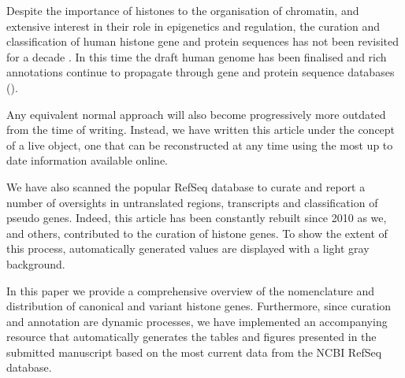 

  Despite the importance of histones to the organisation of chromatin, and extensive interest
  in their role in epigenetics and regulation, the curation and classification of human histone
  gene and protein sequences has not been revisited for a decade \citep{Marzluff02}. In this time
  the draft human genome has been finalised and rich annotations continue to propagate through
  gene and protein sequence databases ().

  Any equivalent normal approach will also become progressively more outdated from the
  time of writing. Instead, we have written this article under the concept of a live
  object, one that can be reconstructed at any time using the most up to date information
  available online.

  We have also scanned the popular RefSeq
  database to curate and report a number of oversights in untranslated regions, transcripts and
  classification of pseudo genes. Indeed, this article has been constantly
  rebuilt since 2010 as we, and others, contributed to the curation of histone
  genes.  To show the extent of this process,
  automatically generated values are displayed with a light gray background.

  In this paper we provide a comprehensive overview of the nomenclature and distribution
  of canonical and variant histone genes. Furthermore, since curation and annotation are
  dynamic processes, we have implemented an accompanying resource that automatically generates
  the tables and figures presented in the submitted manuscript based
  on the most current data from the NCBI RefSeq database.

